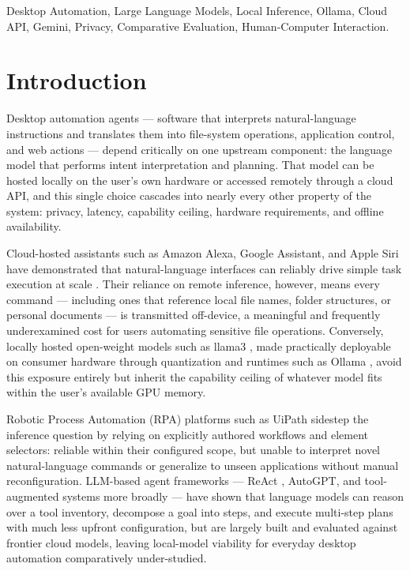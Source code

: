 \documentclass[conference]{IEEEtran}
\begin{document}
\begin{IEEEkeywords}
Desktop Automation, Large Language Models, Local Inference, Ollama, Cloud API, Gemini, Privacy, Comparative Evaluation, Human-Computer Interaction.
\end{IEEEkeywords}

\section{Introduction}

Desktop automation agents --- software that interprets natural-language instructions and translates them into file-system operations, application control, and web actions --- depend critically on one upstream component: the language model that performs intent interpretation and planning. That model can be hosted locally on the user's own hardware or accessed remotely through a cloud API, and this single choice cascades into nearly every other property of the system: privacy, latency, capability ceiling, hardware requirements, and offline availability.

Cloud-hosted assistants such as Amazon Alexa, Google Assistant, and Apple Siri have demonstrated that natural-language interfaces can reliably drive simple task execution at scale \cite{ref1}. Their reliance on remote inference, however, means every command --- including ones that reference local file names, folder structures, or personal documents --- is transmitted off-device, a meaningful and frequently underexamined cost for users automating sensitive file operations. Conversely, locally hosted open-weight models such as llama3 \cite{ref11}, made practically deployable on consumer hardware through quantization \cite{ref20} and runtimes such as Ollama \cite{ref2}, avoid this exposure entirely but inherit the capability ceiling of whatever model fits within the user's available GPU memory.

Robotic Process Automation (RPA) platforms such as UiPath \cite{ref3} sidestep the inference question by relying on explicitly authored workflows and element selectors: reliable within their configured scope, but unable to interpret novel natural-language commands or generalize to unseen applications without manual reconfiguration. LLM-based agent frameworks --- ReAct \cite{ref4}, AutoGPT, and tool-augmented systems more broadly \cite{ref5} --- have shown that language models can reason over a tool inventory, decompose a goal into steps, and execute multi-step plans with much less upfront configuration, but are largely built and evaluated against frontier cloud models, leaving local-model viability for everyday desktop automation comparatively under-studied.
\end{document}
